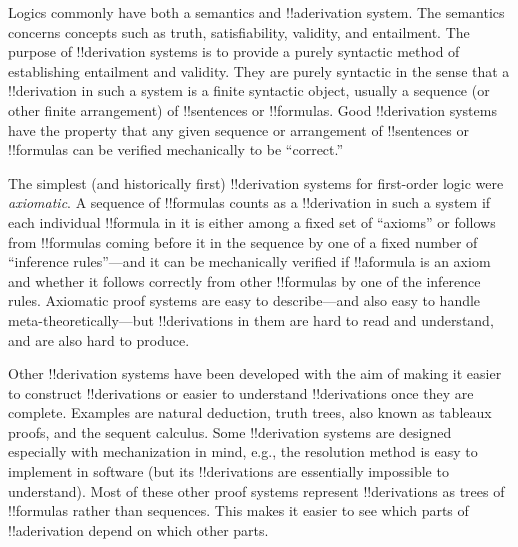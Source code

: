\documentclass[../../../include/open-logic-section]{subfiles}
\begin{document}
      {}
      {}


Logics commonly have both a semantics and !!a{derivation}
system. The semantics concerns concepts such as truth, satisfiability,
validity, and entailment.  The purpose of !!{derivation} systems is to
provide a purely syntactic method of establishing entailment and
validity.  They are purely syntactic in the sense that a
!!{derivation} in such a system is a finite syntactic object, usually
a sequence (or other finite arrangement) of !!{sentence}s or
!!{formula}s.  Good !!{derivation} systems have the property that any
given sequence or arrangement of !!{sentence}s or !!{formula}s can be
verified mechanically to be ``correct.''  

The simplest (and historically first) !!{derivation} systems for
first-order logic were \emph{axiomatic}.  A sequence of !!{formula}s
counts as a !!{derivation} in such a system if each individual
!!{formula} in it is either among a fixed set of ``axioms'' or follows
from !!{formula}s coming before it in the sequence by one of a fixed
number of ``inference rules''---and it can be mechanically verified if
!!a{formula} is an axiom and whether it follows correctly from other
!!{formula}s by one of the inference rules.  Axiomatic proof systems
are easy to describe---and also easy to handle
meta-theoretically---but !!{derivation}s in them are hard to read and
understand, and are also hard to produce.

Other !!{derivation} systems have been developed with the aim of making it
easier to construct !!{derivation}s or easier to understand
!!{derivation}s once they are complete.  Examples are natural
deduction, truth trees, also known as tableaux proofs, and the sequent
calculus.  Some !!{derivation} systems are designed especially with
mechanization in mind, e.g., the resolution method is easy to
implement in software (but its !!{derivation}s are essentially
impossible to understand). Most of these other proof systems represent
!!{derivation}s as trees of !!{formula}s rather than sequences. This
makes it easier to see which parts of !!a{derivation} depend on which
other parts.
\end{document}
